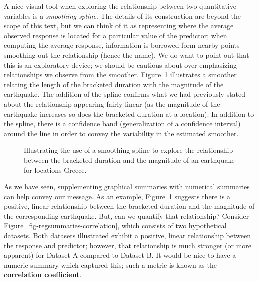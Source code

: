 \documentclass[
  letterpaper,
  DIV=11,
  numbers=noendperiod]{scrreprt}
\theoremstyle{definition}
\theoremstyle{definition}
\theoremstyle{plain}
\theoremstyle{remark}
\begin{document}
A nice visual tool when exploring the relationship between two
quantitative variables is a \emph{smoothing spline}. The details of its
construction are beyond the scope of this text, but we can think of it
as representing where the average observed response is located for a
particular value of the predictor; when computing the average response,
information is borrowed form nearby points smoothing out the
relationship (hence the name). We do want to point out that this is an
exploratory device; we should be cautious about over-emphasizing
relationships we observe from the smoother.
Figure~\ref{fig-regsummaries-spline} illustrates a smoother relating the
length of the bracketed duration with the magnitude of the earthquake.
The addition of the spline confirms what we had previously stated about
the relationship appearing fairly linear (as the magnitude of the
earthquake increases so does the bracketed duration at a location). In
addition to the spline, there is a confidence band (generalization of a
confidence interval) around the line in order to convey the variability
in the estimated smoother.

\begin{figure}


\caption{\label{fig-regsummaries-spline}Illustrating the use of a
smoothing spline to explore the relationship between the bracketed
duration and the magnitude of an earthquake for locations Greece.}

\end{figure}%

As we have seen, supplementing graphical summaries with numerical
summaries can help convey our message. As an example,
Figure~\ref{fig-regsummaries-spline} suggests there is a positive,
linear relationship between the bracketed duration and the magnitude of
the corresponding earthquake. But, can we quantify that relationship?
Consider Figure~\ref{fig-regsummaries-correlation}, which consists of
two hypothetical datasets. Both datasets illustrated exhibit a positive,
linear relationship between the response and predictor; however, that
relationship is much stronger (or more apparent) for Dataset A compared
to Dataset B. It would be nice to have a numeric summary which captured
this; such a metric is known as the \textbf{correlation coefficient}.
\end{document}
